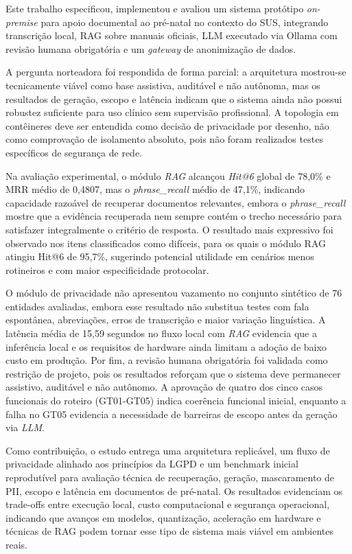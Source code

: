 Este trabalho especificou, implementou e avaliou um sistema protótipo \textit{on-premise} para apoio documental ao pré-natal no contexto do SUS, integrando transcrição local, RAG sobre manuais oficiais, LLM executado via Ollama com revisão humana obrigatória e um \textit{gateway} de anonimização de dados.

A pergunta norteadora foi respondida de forma parcial:
a arquitetura mostrou-se tecnicamente viável como base assistiva, auditável e não autônoma, mas os resultados de geração, escopo e latência indicam que o sistema ainda não possui robustez suficiente para uso clínico sem supervisão profissional.
A topologia em contêineres deve ser entendida como decisão de privacidade por desenho, não como comprovação de isolamento absoluto, pois não foram realizados testes específicos de segurança de rede.

Na avaliação experimental, o módulo \textit{RAG} alcançou \textit{Hit@6} global de 78,0\% e MRR médio de 0,4807, mas o \textit{phrase\_recall} médio de 47,1\%, indicando capacidade razoável de recuperar documentos relevantes, embora o \textit{phrase\_recall} mostre que a evidência recuperada nem sempre contém o trecho necessário para satisfazer integralmente o critério de resposta.
O resultado mais expressivo foi observado nos itens classificados como difíceis, para os quais o módulo RAG atingiu Hit@6 de 95,7\%, sugerindo potencial utilidade em cenários menos rotineiros e com maior especificidade protocolar.

O módulo de privacidade não apresentou vazamento no conjunto sintético de 76 entidades avaliadas, embora esse resultado não substitua testes com fala espontânea, abreviações, erros de transcrição e maior variação linguística.
A latência média de 15,59 segundos no fluxo local com \textit{RAG} evidencia que a inferência local e os requisitos de hardware ainda limitam a adoção de baixo custo em produção.
Por fim, a revisão humana obrigatória foi validada como restrição de projeto, pois os resultados reforçam que o sistema deve permanecer assistivo, auditável e não autônomo.
A aprovação de quatro dos cinco casos funcionais do roteiro (GT01-GT05) indica coerência funcional inicial, enquanto a falha no GT05 evidencia a necessidade de barreiras de escopo antes da geração via \textit{LLM}.

Como contribuição, o estudo entrega uma arquitetura replicável, um fluxo de privacidade alinhado aos princípios da LGPD e um benchmark inicial reprodutível para avaliação técnica de recuperação, geração, mascaramento de PII, escopo e latência em documentos de pré-natal.
Os resultados evidenciam os trade-offs entre execução local, custo computacional e segurança operacional, indicando que avanços em modelos, quantização, aceleração em hardware e técnicas de RAG podem tornar esse tipo de sistema mais viável em ambientes reais.
